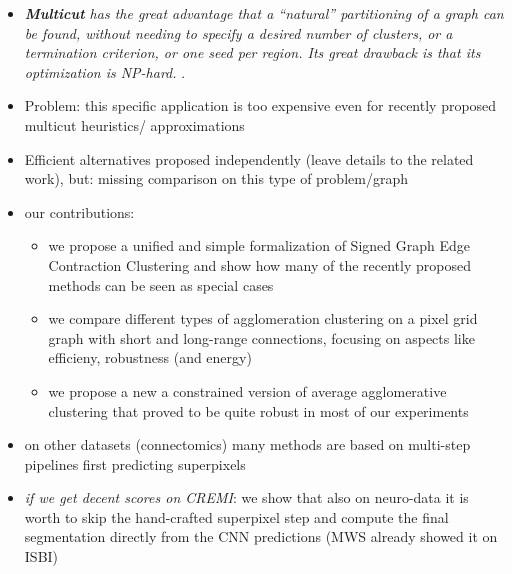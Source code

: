 \documentclass[10pt,twocolumn,letterpaper]{article}
\newcommand\SOURCE[1]{{\color{green}{(from: #1)}}}
\begin{document}
\begin{itemize}
\item \textit{\textbf{Multicut} has the great advantage that a “natural” partitioning of a graph can be found, without needing to specify a desired number of clusters, or a termination criterion, or one seed per region. Its great drawback is that its optimization is NP-hard.} \SOURCE{MWS}.
\item Problem: this specific application is too expensive even for recently proposed multicut heuristics/ approximations
\item Efficient alternatives proposed independently (leave details to the related work), but: missing comparison on this type of problem/graph
\item our contributions:
\begin{itemize}
\item we propose a unified and simple formalization of Signed Graph Edge Contraction Clustering and show how many of the recently proposed methods can be seen as special cases
\item we compare different types of agglomeration clustering on a pixel grid graph with short and long-range connections, focusing on aspects like efficieny, robustness (and energy) 
\item we propose a new a constrained version of average agglomerative clustering that proved to be quite robust in most of our experiments
\end{itemize}
\item on other datasets (connectomics) many methods are based on multi-step pipelines first predicting superpixels
\item \textit{if we get decent scores on CREMI}: we show that also on neuro-data it is worth to skip the hand-crafted superpixel step and compute the final segmentation directly from the CNN predictions (MWS already showed it on ISBI)

\end{itemize}
\end{document}
